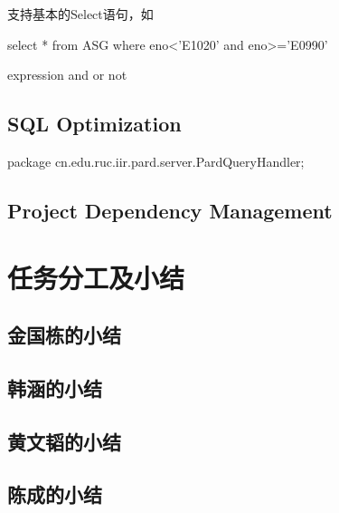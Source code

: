 \documentclass[a4paper, 12pt]{ctexart}
\begin{document}
支持基本的Select语句，如

select * from ASG where eno<’E1020’ and eno>=’E0990’


expression  and or not





\subsection{SQL Optimization}
package cn.edu.ruc.iir.pard.server.PardQueryHandler;





\subsection{Project Dependency Management}



\section{任务分工及小结}

\subsection{金国栋的小结}

\subsection{韩涵的小结}

\subsection{黄文韬的小结}

\subsection{陈成的小结}





 
\end{document}
